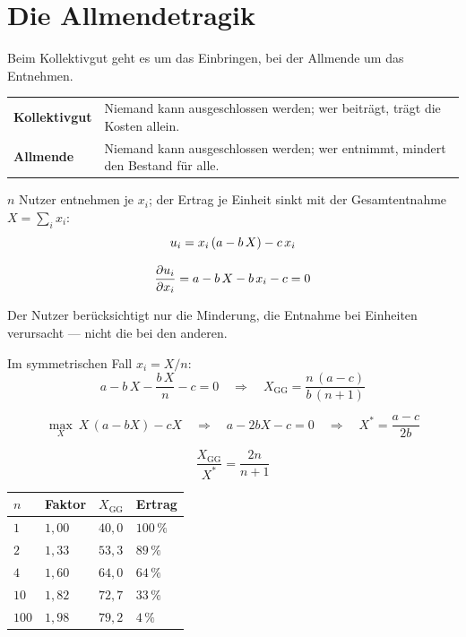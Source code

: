 \section{Die Allmendetragik}

\begin{merksatz}
Beim Kollektivgut geht es um das Einbringen, bei der Allmende um das Entnehmen.

\begin{center}
{\small
\renewcommand{\arraystretch}{1.5}
\begin{tabular}{@{}P{2.4cm}P{6.2cm}@{}}
\toprule
\textbf{Kollektivgut} & Niemand kann ausgeschlossen werden; wer beiträgt, trägt die Kosten allein.\\
\textbf{Allmende} & Niemand kann ausgeschlossen werden; wer entnimmt, mindert den Bestand für alle.\\
\bottomrule
\end{tabular}}
\end{center}

$n$ Nutzer entnehmen je $x_i$; der Ertrag je Einheit sinkt mit der Gesamtentnahme $X = \sum_i x_i$:
\[ u_i = x_i\,(a - b\,X) - c\,x_i \]

\[ \frac{\partial u_i}{\partial x_i} = a - b\,X - b\,x_i - c = 0 \]

 Der Nutzer berücksichtigt nur die Minderung, die  Entnahme bei  Einheiten verursacht --- nicht die bei den anderen.

Im symmetrischen Fall $x_i = X/n$:
\[ a - b\,X - \frac{b\,X}{n} - c = 0 \quad\Longrightarrow\quad X_{\text{GG}} = \frac{n\,(a-c)}{b\,(n+1)} \]

\[ \max_X \ X\,(a-bX) - cX \quad\Longrightarrow\quad a - 2bX - c = 0 \quad\Longrightarrow\quad X^{*} = \frac{a-c}{2b} \]

\[ \frac{X_{\text{GG}}}{X^{*}} = \frac{2n}{n+1} \]

\begin{center}
{\small
\renewcommand{\arraystretch}{1.48}
\begin{tabular}{@{}P{1.4cm}P{1.8cm}P{2.2cm}P{2.4cm}@{}}
\toprule
$n$ & \textbf{Faktor} & $X_{\text{GG}}$ & \textbf{Ertrag}\\
\midrule
$1$ & $1{,}00$ & $40{,}0$ & $100\,\%$\\
$2$ & $1{,}33$ & $53{,}3$ & $89\,\%$\\
$4$ & $1{,}60$ & $64{,}0$ & $64\,\%$\\
$10$ & $1{,}82$ & $72{,}7$ & $33\,\%$\\
$100$ & $1{,}98$ & $79{,}2$ & $4\,\%$\\
\bottomrule
\end{tabular}}
\end{center}


\end{merksatz}
